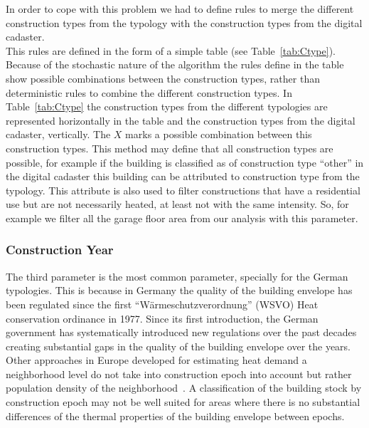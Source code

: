 In order to cope with this problem we had to define rules to merge the
different construction types from the typology with the construction types from
the digital cadaster.\\

This rules are defined in the form of a simple table (see
Table~\ref{tab:Ctype}).  Because of the stochastic nature of the algorithm the
rules define in the table show possible combinations between the construction
types, rather than deterministic rules to combine the different construction
types.  In Table~\ref{tab:Ctype} the construction types from the different
typologies are represented horizontally in the table and the construction types
from the digital cadaster, vertically.  The $X$ marks a possible combination
between this construction types.  This method may define that all construction
types are possible, for example if the building is classified as of
construction type ``other'' in the digital cadaster this building can be
attributed to construction type from the typology.  This attribute is also used
to filter constructions that have a residential use but are not necessarily
heated, at least not with the same intensity.  So, for example we filter all
the garage floor area from our analysis with this parameter.\\


 
\subsubsection{Construction Year}

The third parameter is the most common parameter, specially for the German
typologies. This is because in Germany the quality of the building envelope
has been regulated since the first ``Wärmeschutzverordnung'' (WSVO) Heat
conservation ordinance in 1977. Since its first introduction, the German
government has systematically introduced new regulations over the past decades
creating substantial gaps in the quality of the building envelope over the
years.\\

Other approaches in Europe developed for estimating heat demand a neighborhood
level do not take into construction epoch into account but rather population
density of the neighborhood~\cite{Finney.2012,Finney.2012b,Finney.2012c}. A
classification of the building stock by construction epoch may not be well
suited for areas where there is no substantial differences of the thermal
properties of the building envelope between epochs.\\

